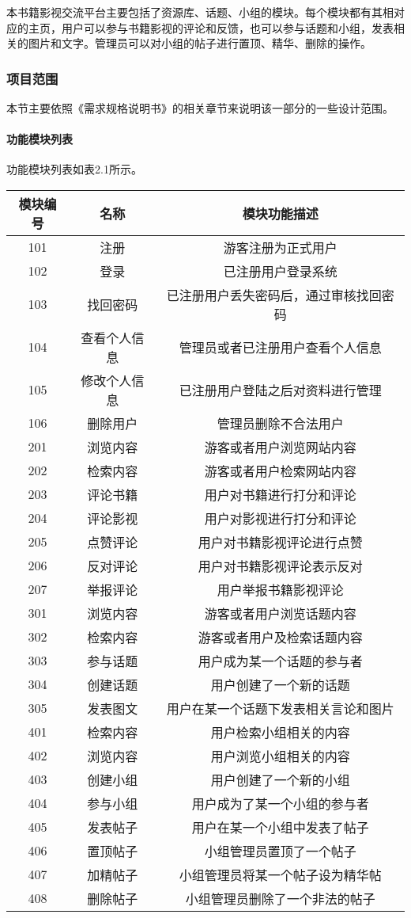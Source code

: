 \documentclass[
]{article}
\begin{document}
本书籍影视交流平台主要包括了资源库、话题、小组的模块。每个模块都有其相对应的主页，用户可以参与书籍影视的评论和反馈，也可以参与话题和小组，发表相关的图片和文字。管理员可以对小组的帖子进行置顶、精华、删除的操作。

\hypertarget{header-n3184}{%
\subsubsection{项目范围}\label{header-n3184}}

本节主要依照《需求规格说明书》的相关章节来说明该一部分的一些设计范围。

\hypertarget{header-n3186}{%
\paragraph{功能模块列表}\label{header-n3186}}

功能模块列表如表2.1所示。

\begin{longtable}[]{@{}ccc@{}}
\toprule
模块编号 & 名称 & 模块功能描述\tabularnewline
\midrule
\endhead
101 & 注册 & 游客注册为正式用户\tabularnewline
102 & 登录 & 已注册用户登录系统\tabularnewline
103 & 找回密码 & 已注册用户丢失密码后，通过审核找回密码\tabularnewline
104 & 查看个人信息 & 管理员或者已注册用户查看个人信息\tabularnewline
105 & 修改个人信息 & 已注册用户登陆之后对资料进行管理\tabularnewline
106 & 删除用户 & 管理员删除不合法用户\tabularnewline
201 & 浏览内容 & 游客或者用户浏览网站内容\tabularnewline
202 & 检索内容 & 游客或者用户检索网站内容\tabularnewline
203 & 评论书籍 & 用户对书籍进行打分和评论\tabularnewline
204 & 评论影视 & 用户对影视进行打分和评论\tabularnewline
205 & 点赞评论 & 用户对书籍影视评论进行点赞\tabularnewline
206 & 反对评论 & 用户对书籍影视评论表示反对\tabularnewline
207 & 举报评论 & 用户举报书籍影视评论\tabularnewline
301 & 浏览内容 & 游客或者用户浏览话题内容\tabularnewline
302 & 检索内容 & 游客或者用户及检索话题内容\tabularnewline
303 & 参与话题 & 用户成为某一个话题的参与者\tabularnewline
304 & 创建话题 & 用户创建了一个新的话题\tabularnewline
305 & 发表图文 & 用户在某一个话题下发表相关言论和图片\tabularnewline
401 & 检索内容 & 用户检索小组相关的内容\tabularnewline
402 & 浏览内容 & 用户浏览小组相关的内容\tabularnewline
403 & 创建小组 & 用户创建了一个新的小组\tabularnewline
404 & 参与小组 & 用户成为了某一个小组的参与者\tabularnewline
405 & 发表帖子 & 用户在某一个小组中发表了帖子\tabularnewline
406 & 置顶帖子 & 小组管理员置顶了一个帖子\tabularnewline
407 & 加精帖子 & 小组管理员将某一个帖子设为精华帖\tabularnewline
408 & 删除帖子 & 小组管理员删除了一个非法的帖子\tabularnewline
\bottomrule
\end{longtable}
\end{document}

